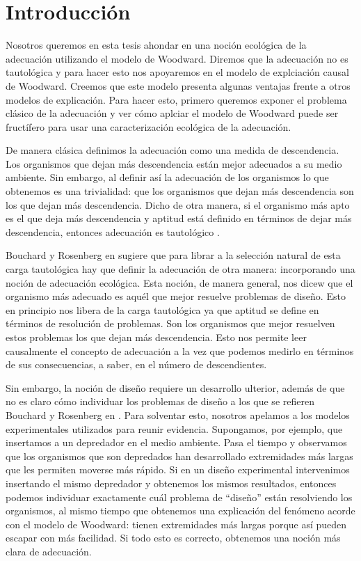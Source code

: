
\chapter*{Introducción}


\noindent Nosotros queremos en esta tesis ahondar en una noción ecológica de la adecuación utilizando el modelo de Woodward. Diremos que la adecuación no es tautológica y para hacer esto nos apoyaremos en el modelo de explciación causal de Woodward. Creemos que este modelo presenta algunas ventajas frente a otros modelos de explicación. Para hacer esto, primero queremos exponer el problema clásico de la adecuación y ver cómo aplciar el modelo de Woodward puede ser fructífero para usar una caracterización ecológica de la adecuación.

De manera clásica definimos la adecuación como una medida de descendencia. Los organismos que dejan más descendencia están mejor adecuados a su medio ambiente. Sin embargo, al definir así la adecuación de los organismos lo que obtenemos es una trivialidad: que los organismos que dejan más descendencia son los que dejan más descendencia. Dicho de otra manera, si el organismo más apto es el que deja más descendencia y aptitud está definido en términos de dejar más descendencia, entonces adecuación es tautológico \cite{Paul1992, sep-fitness}.

Bouchard y Rosenberg en \cite{Bouchard2004} sugiere que para librar a la selección natural de esta carga tautológica hay que definir la adecuación de otra manera: incorporando una noción de adecuación ecológica. Esta noción, de manera general, nos dicew que el organismo más adecuado es aquél que mejor resuelve problemas de diseño. Esto en principio nos libera de la carga tautológica ya que aptitud se define en términos de resolución de problemas. Son los organismos que mejor resuelven estos problemas los que dejan más descendencia. Esto nos permite leer causalmente el concepto de adecuación a la vez que podemos medirlo en términos de sus consecuencias, a saber, en el número de descendientes.

Sin embargo, la noción de diseño requiere un desarrollo ulterior, además de que no es claro cómo individuar los problemas de diseño a los que se refieren Bouchard y Rosenberg en \citeyear{Bouchard2004}. Para solventar esto, nosotros apelamos a los modelos experimentales utilizados para reunir evidencia. Supongamos, por ejemplo, que insertamos a un depredador en el medio ambiente. Pasa el tiempo y observamos que los organismos que son depredados han desarrollado extremidades más largas que les permiten moverse más rápido. Si en un diseño experimental intervenimos insertando el mismo depredador y obtenemos los mismos resultados, entonces podemos individuar exactamente cuál problema de ``diseño'' están resolviendo los organismos, al mismo tiempo que obtenemos una explicación del fenómeno acorde con el modelo de Woodward: tienen extremidades más largas porque así pueden escapar con más facilidad. Si todo esto es correcto, obtenemos una noción más clara de adecuación.

